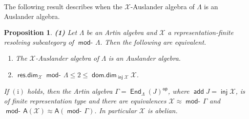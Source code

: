 \documentclass[oneside, a4paper,reqno]{amsart}
\numberwithin{equation}{section}
\newtheorem{prop}[thm]{Proposition}
\theoremstyle{definition}
\begin{document}
 The following result describes when the ${\mathcal X}$-Auslander algebra of
$\Lambda$ is an Auslander algebra.

\begin{prop} {\bf (1)} Let $\Lambda$ be an Artin algebra and ${\mathcal X}$ a
representation-finite resolving subcategory of $\operatorname*{\mathsf{mod}-\!}\Lambda$. Then
the following are equivalent.
\begin{enumerate}
\item The ${\mathcal X}$-Auslander algebra of $\Lambda$ is an Auslander
algebra.
\item $\operatorname*{\mathsf{res.dim}}_{\mathcal X}\operatorname*{\mathsf{mod}-\!}\Lambda \leq 2 \leq \operatorname*{\mathsf{dom.dim}}_{\operatorname*{\mathsf{inj}}{\mathcal X}}{\mathcal X}$.
\end{enumerate}
If $\mathrm{(i)}$ holds, then the Artin algebra  $\Gamma =
\operatorname*{\mathsf{End}}_{\Lambda}(J)^\operatorname*{\mathsf{op}}$, where $\operatorname*{\mathsf{add}} J = \operatorname*{\mathsf{inj}}{\mathcal X}$, is of finite
representation type and there are equivalences ${\mathcal X} \approx
\operatorname*{\mathsf{mod}-\!}\Gamma$ and $\operatorname*{\mathsf{mod}-\!}\mathsf{A}({\mathcal X}) \approx
\mathsf{A}(\operatorname*{\mathsf{mod}-\!}\Gamma)$. In  particular ${\mathcal X}$ is abelian.


\end{prop}
\end{document}
